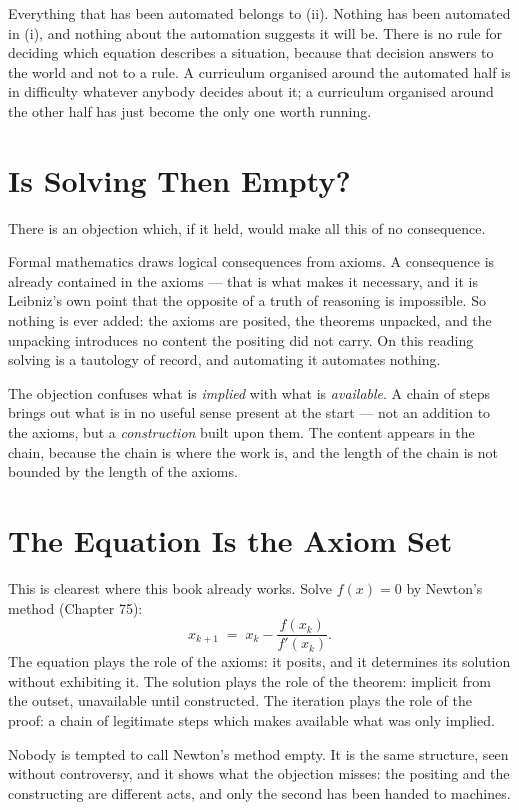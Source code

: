Everything that has been automated belongs to (ii). Nothing has been automated in (i), and nothing
about the automation suggests it will be. There is no rule for deciding which equation describes a
situation, because that decision answers to the world and not to a rule. A curriculum organised
around the automated half is in difficulty whatever anybody decides about it; a curriculum organised
around the other half has just become the only one worth running.

\section{Is Solving Then Empty?}

There is an objection which, if it held, would make all this of no consequence.

Formal mathematics draws logical consequences from axioms. A consequence is already contained in
the axioms --- that is what makes it necessary, and it is Leibniz's own point that the opposite of a
truth of reasoning is impossible. So nothing is ever added: the axioms are posited, the theorems
unpacked, and the unpacking introduces no content the positing did not carry. On this reading
solving is a tautology of record, and automating it automates nothing.

The objection confuses what is \emph{implied} with what is \emph{available}. A chain of steps brings
out what is in no useful sense present at the start --- not an addition to the axioms, but a
\emph{construction} built upon them. The content appears in the chain, because the chain is where
the work is, and the length of the chain is not bounded by the length of the axioms.

\section{The Equation Is the Axiom Set}

This is clearest where this book already works. Solve $f(x)=0$ by Newton's method
(Chapter 75):
\[
x_{k+1} \;=\; x_k - \frac{f(x_k)}{f'(x_k)} .
\]
The equation plays the role of the axioms: it posits, and it determines its solution without
exhibiting it. The solution plays the role of the theorem: implicit from the outset, unavailable
until constructed. The iteration plays the role of the proof: a chain of legitimate steps which
makes available what was only implied.

Nobody is tempted to call Newton's method empty. It is the same structure, seen without
controversy, and it shows what the objection misses: the positing and the constructing are
different acts, and only the second has been handed to machines.


